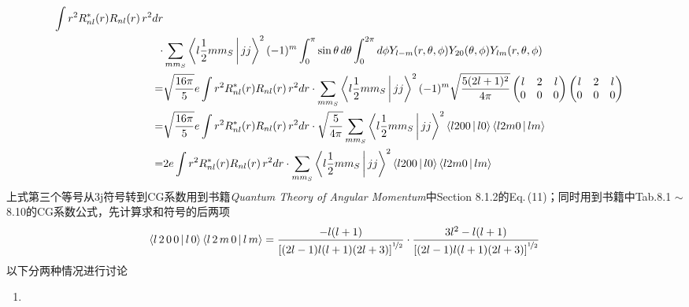 \begin{exercise*}[C.14]
\begin{equation*}
\begin{aligned}
           \int r^2 R_{nl}^{\ast}(r) R_{nl}(r)\, r^2dr \\
           \cdot
           &\sum_{m m_{S}}  \Braket{l\frac{1}{2}mm_{S} | jj}^2  (-1)^{m}
           \int_{0}^{\pi}\sin{\theta}\, d\theta \int_{0}^{2\pi} d\phi
           Y_{l-m}(r, \theta, \phi) Y_{20}(\theta, \phi) Y_{lm}(r, \theta, \phi) \\
          =&  \sqrt{\frac{16\pi}{5}} e
           \int r^2 R_{nl}^{\ast}(r) R_{nl}(r)\, r^2dr
           \cdot
           \sum_{m m_{S}}  \Braket{l\frac{1}{2}mm_{S} | jj}^2 (-1)^{m}
           \sqrt{\frac{5(2l + 1)^2}{4\pi}}
           \begin{pmatrix}
               l & 2 & l \\
               0 & 0   & 0
           \end{pmatrix}
           \begin{pmatrix}
               l & 2 & l \\
               0 & 0 & 0
           \end{pmatrix} \\
           =&  \sqrt{\frac{16\pi}{5}} e
           \int r^2 R_{nl}^{\ast}(r) R_{nl}(r)\, r^2dr
           \cdot \sqrt{\frac{5}{4\pi}}
           \sum_{m m_{S}}
           \Braket{l\frac{1}{2}mm_{S} | jj}^2
           \Braket{l200 | l0}
           \Braket{l2m0 | lm} \\
           =&  2 e
           \int r^2 R_{nl}^{\ast}(r) R_{nl}(r)\, r^2dr
           \cdot
           \sum_{m m_{S}}
           \Braket{l\frac{1}{2}mm_{S} | jj}^2
           \Braket{l200 | l0}
           \Braket{l2m0 | lm} \\
        \end{aligned}
    \end{equation*}
    上式第三个等号从3j符号转到CG系数用到书籍\textit{Quantum Theory of Angular Momentum}中Section 8.1.2的Eq.\,(11)；同时用到书籍中Tab.8.1 $\sim$  8.10的CG系数公式，先计算求和符号的后两项
    \begin{equation*}
        \Braket{l\, 2\, 0\, 0 | l\, 0}\Braket{l\, 2\, m\, 0 | l\, m} 
        =
        \frac{-l(l+1)}{\left[(2l - 1)l(l+1)(2l+3)\right]^{\nicefrac{1}{2}}}
        \cdot
        \frac{3l^2 - l(l+1)}{\left[(2l - 1)l(l+1)(2l+3)\right]^{\nicefrac{1}{2}}}
    \end{equation*}
    以下分两种情况进行讨论
    \begin{enumerate}
        \item 
    \end{enumerate}
\end{exercise*}

